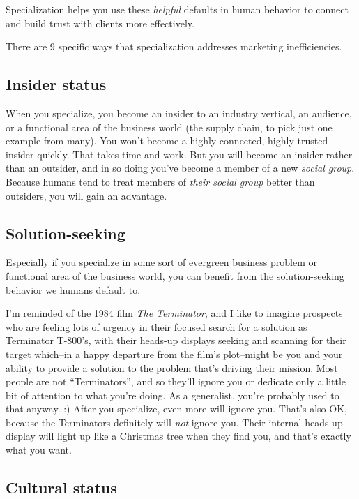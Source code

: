 Specialization helps you use these \emph{helpful} defaults in human behavior to connect and build trust with clients more effectively.

There are 9 specific ways that specialization addresses marketing inefficiencies.

\subsection{Insider status}

When you specialize, you become an insider to an industry vertical, an audience, or a functional area of the business world (the supply chain, to pick just one example from many). You won't become a highly connected, highly trusted insider quickly. That takes time and work. But you will become an insider rather than an outsider, and in so doing you've become a member of a new \emph{social group}. Because humans tend to treat members of \emph{their social group} better than outsiders, you will gain an advantage.

\subsection{Solution-seeking}

Especially if you specialize in some sort of evergreen business problem or functional area of the business world, you can benefit from the solution-seeking behavior we humans default to.

I'm reminded of the 1984 film \emph{The Terminator}, and I like to imagine prospects who are feeling lots of urgency in their focused search for a solution as Terminator T-800's, with their heads-up displays seeking and scanning for their target which--in a happy departure from the film's plot--might be you and your ability to provide a solution to the problem that's driving their mission. Most people are not ``Terminators'', and so they'll ignore you or dedicate only a little bit of attention to what you're doing. As a generalist, you're probably used to that anyway. :) After you specialize, even more will ignore you. That's also OK, because the Terminators definitely will \emph{not} ignore you. Their internal heads-up-display will light up like a Christmas tree when they find you, and that's exactly what you want.

\subsection{Cultural status}

